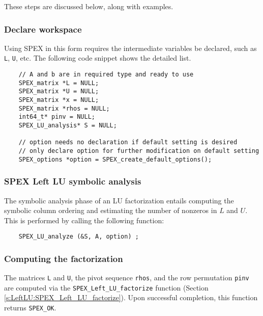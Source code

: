 \documentclass[12pt]{report}
\theoremstyle{definition}
\begin{document}
\noindent These steps are discussed below, along with examples.

\subsubsection{Declare workspace}

Using SPEX in this form requires the intermediate variables be declared, such as \verb|L|, \verb|U|, etc. The following code snippet shows the detailed list.

{\small
\begin{verbatim}
    // A and b are in required type and ready to use
    SPEX_matrix *L = NULL;
    SPEX_matrix *U = NULL;
    SPEX_matrix *x = NULL;
    SPEX_matrix *rhos = NULL;
    int64_t* pinv = NULL;
    SPEX_LU_analysis* S = NULL;

    // option needs no declaration if default setting is desired
    // only declare option for further modification on default setting
    SPEX_options *option = SPEX_create_default_options();
     \end{verbatim} }

\subsubsection{SPEX Left LU symbolic analysis}

The symbolic analysis phase of an LU factorization entails computing the symbolic column ordering and estimating the number of nonzeros in $L$ and $U$. This is performed by calling the following function:

{\small
    \begin{verbatim}
    SPEX_LU_analyze (&S, A, option) ; \end{verbatim} }


\subsubsection{Computing the factorization}

The matrices \verb|L| and \verb|U|, the pivot sequence \verb|rhos|, and the row
permutation \verb|pinv| are computed via the \verb|SPEX_Left_LU_factorize| function
(Section \ref{s:LeftLU:SPEX_Left_LU_factorize}).  Upon successful completion, this
function returns \verb|SPEX_OK|.
\end{document}
